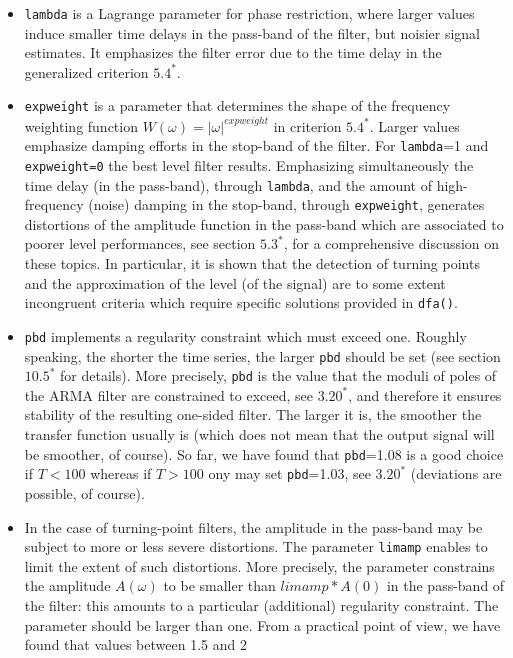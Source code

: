 \documentclass[a4paper]{article}
\begin{document}
\begin{itemize}
\item \texttt{lambda} is a Lagrange parameter for phase restriction,
  where larger values induce smaller time delays in the pass-band of
  the filter, but noisier signal estimates. It emphasizes the filter
  error due to the time delay in the generalized criterion $5.4^*$. 
\item \texttt{expweight} is a parameter that determines the shape of
  the frequency weighting function $W(\omega)=|\omega|^{expweight}$ in
  criterion $5.4^*$. Larger values emphasize damping efforts in the
  stop-band of the filter. For \texttt{lambda}=1 and
  \texttt{expweight=0} the best level filter results. Emphasizing
  simultaneously the time delay (in the pass-band), through
  \texttt{lambda}, and the amount of high-frequency (noise) damping in
  the stop-band, through \texttt{expweight}, generates distortions of
  the amplitude function in the pass-band which are associated to
  poorer level performances, see section $5.3^*$, for a comprehensive
  discussion on these topics. In particular, it is shown that the
  detection of turning points and the approximation of the level (of
  the signal) are to some extent incongruent criteria which require
  specific solutions provided in \texttt{dfa()}. 
\item \texttt{pbd} implements a regularity constraint which must
  exceed one. Roughly speaking, the shorter the time series, the
  larger \texttt{pbd} should be set (see section $10.5^*$ for
  details). More precisely, \texttt{pbd} is the value that the moduli
  of poles of the ARMA filter are constrained to exceed, see $3.20^*$,
  and therefore it ensures stability of the resulting one-sided
  filter. The larger it is, the smoother the transfer function usually
  is (which does not mean that the output signal will be smoother, of
  course). So far, we have found that \texttt{pbd}=1.08 is a good
  choice if $T<100$ whereas if $T>100$ ony may set \texttt{pbd}=1.03,
  see $3.20^*$ (deviations are possible, of course). 
\item In the case of turning-point filters, the amplitude in the
  pass-band may be subject to more or less severe distortions. The
  parameter \texttt{limamp} enables to limit the extent of such
  distortions. More precisely, the parameter constrains the amplitude
  $A(\omega)$ to be smaller than $limamp*A(0)$ in the pass-band of the
  filter: this amounts to a particular (additional) regularity
  constraint. The parameter should be larger than one. From a
  practical point of view, we have found that values between 1.5 and 2

\end{itemize}
\end{document}
